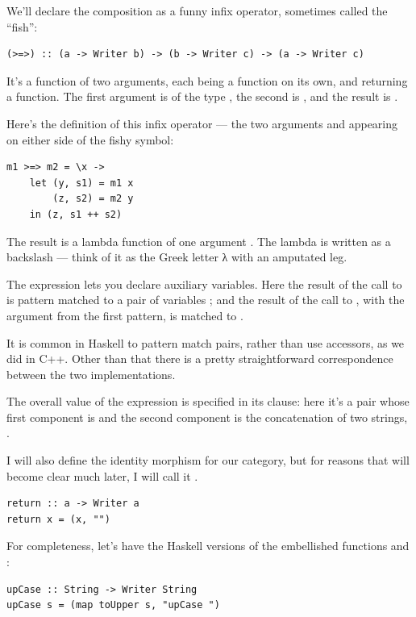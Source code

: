 We'll declare the composition as a funny infix operator, sometimes
called the ``fish'':

\begin{verbatim}
(>=>) :: (a -> Writer b) -> (b -> Writer c) -> (a -> Writer c)
\end{verbatim}

It's a function of two arguments, each being a function on its own, and
returning a function. The first argument is of the type
, the second is
, and the result is
.

Here's the definition of this infix operator --- the two arguments
 and  appearing on either side of the fishy
symbol:

\begin{verbatim}
m1 >=> m2 = \x ->
    let (y, s1) = m1 x
        (z, s2) = m2 y
    in (z, s1 ++ s2)
\end{verbatim}

The result is a lambda function of one argument . The lambda
is written as a backslash --- think of it as the Greek letter λ with an
amputated leg.

The  expression lets you declare auxiliary variables. Here
the result of the call to  is pattern matched to a pair of
variables ; and the result of the call to ,
with the argument  from the first pattern, is matched to
.

It is common in Haskell to pattern match pairs, rather than use
accessors, as we did in C++. Other than that there is a pretty
straightforward correspondence between the two implementations.

The overall value of the  expression is specified in its
 clause: here it's a pair whose first component is 
and the second component is the concatenation of two strings,
.

I will also define the identity morphism for our category, but for
reasons that will become clear much later, I will call it
.

\begin{verbatim}
return :: a -> Writer a
return x = (x, "")
\end{verbatim}

For completeness, let's have the Haskell versions of the embellished
functions  and :

\begin{verbatim}
upCase :: String -> Writer String
upCase s = (map toUpper s, "upCase ")
\end{verbatim}

